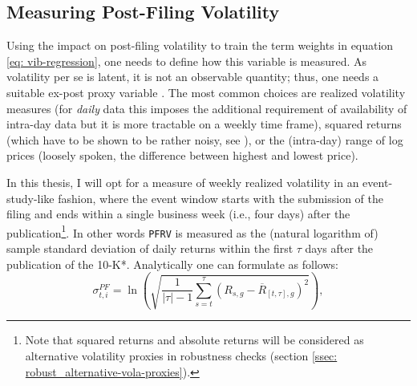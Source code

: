 
\subsection{Measuring Post-Filing Volatility}
\label{ssec: senti_LHS}
Using the impact on post-filing volatility to train the term weights in equation \eqref{eq: vib-regression}, one needs to define how this variable is measured. As volatility per se is latent, it is not an observable quantity; thus, one needs a suitable ex-post proxy variable \parencite{BrownleesEngleKelly2011}. The most common choices are realized volatility measures (for \textit{daily} data this imposes the additional requirement of availability of intra-day data but it is more tractable on a weekly time frame), squared returns (which have to be shown to be rather noisy, see \textcite{PattonSheppard2009}), or the (intra-day) range of log prices (loosely spoken, the difference between highest and lowest price). 

In this thesis, I will opt for a measure of weekly realized volatility in an event-study-like fashion, where the event window starts with the submission of the filing and ends within a single business week (i.e., four days) after the publication\footnote{Note that squared returns and absolute returns will be considered as alternative volatility proxies in robustness checks (section \ref{ssec: robust_alternative-vola-proxies}).}. In other words \texttt{PFRV} is measured as the (natural logarithm of) sample standard deviation of daily returns within the first $\tau$ days after the publication of the 10-K*. Analytically one can formulate as follows: 
\begin{equation} \label{eq: pfrv-definition}
\sigma_{t,i}^{PF}= \ln \left( \sqrt{\dfrac{1}{|\tau | - 1}   \sum_{s = t}^{\tau} \left(   R_{s,g} - \overline{R}_{[t,\tau],g}        \right)^2 } \right),
\end{equation}

